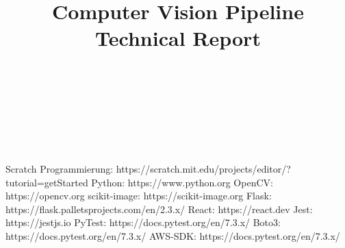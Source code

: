 \documentclass[conference]{IEEEtran}
\begin{document}
\title{\textbf{Computer Vision Pipeline}
	\\Technical Report}

\author{

	\\
	
	\and
	
	\\
	
	\and
	
	\\
	
}


\maketitle



\begin{thebibliography}{00}
	 Scratch Programmierung: https://scratch.mit.edu/projects/editor/?tutorial=getStarted
	 Python: https://www.python.org
	 OpenCV: https://opencv.org
	 scikit-image: https://scikit-image.org
	 Flask: https://flask.palletsprojects.com/en/2.3.x/
	 React: https://react.dev
	 Jest: https://jestjs.io
	 PyTest: https://docs.pytest.org/en/7.3.x/
	 Boto3: https://docs.pytest.org/en/7.3.x/
	 AWS-SDK: https://docs.pytest.org/en/7.3.x/
\end{thebibliography}
\vspace{12pt}
\end{document}
